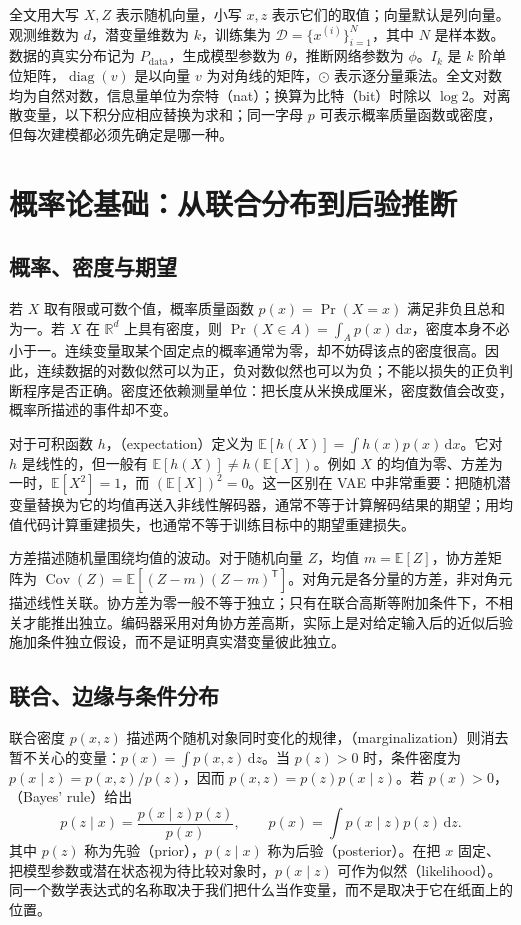 \documentclass[UTF8,12pt,a4paper,fontset=fandol]{ctexart}
\begin{document}
全文用大写 $X,Z$ 表示随机向量，小写 $x,z$ 表示它们的取值；向量默认是列向量。观测维数为 $d$，潜变量维数为 $k$，训练集为 $\mathcal D=\{x^{(i)}\}_{i=1}^{N}$，其中 $N$ 是样本数。数据的真实分布记为 $P_{\mathrm{data}}$，生成模型参数为 $\theta$，推断网络参数为 $\phi$。$I_k$ 是 $k$ 阶单位矩阵，$\operatorname{diag}(v)$ 是以向量 $v$ 为对角线的矩阵，$\odot$ 表示逐分量乘法。全文对数均为自然对数，信息量单位为奈特（nat）；换算为比特（bit）时除以 $\log 2$。对离散变量，以下积分应相应替换为求和；同一字母 $p$ 可表示概率质量函数或密度，但每次建模都必须先确定是哪一种。

\section{概率论基础：从联合分布到后验推断}
\label{sec:vae-probability}

\subsection{概率、密度与期望}
若 $X$ 取有限或可数个值，概率质量函数 $p(x)=\Pr(X=x)$ 满足非负且总和为一。若 $X$ 在 $\mathbb R^d$ 上具有密度，则 $\Pr(X\in A)=\int_A p(x)\,\mathrm dx$，密度本身不必小于一。连续变量取某个固定点的概率通常为零，却不妨碍该点的密度很高。因此，连续数据的对数似然可以为正，负对数似然也可以为负；不能以损失的正负判断程序是否正确。密度还依赖测量单位：把长度从米换成厘米，密度数值会改变，概率所描述的事件却不变。

对于可积函数 $h$，（expectation）定义为 $\mathbb E[h(X)]=\int h(x)p(x)\,\mathrm dx$。它对 $h$ 是线性的，但一般有 $\mathbb E[h(X)]\ne h(\mathbb E[X])$。例如 $X$ 的均值为零、方差为一时，$\mathbb E[X^2]=1$，而 $(\mathbb E[X])^2=0$。这一区别在 VAE 中非常重要：把随机潜变量替换为它的均值再送入非线性解码器，通常不等于计算解码结果的期望；用均值代码计算重建损失，也通常不等于训练目标中的期望重建损失。

方差描述随机量围绕均值的波动。对于随机向量 $Z$，均值 $m=\mathbb E[Z]$，协方差矩阵为 $\operatorname{Cov}(Z)=\mathbb E[(Z-m)(Z-m)^\mathsf T]$。对角元是各分量的方差，非对角元描述线性关联。协方差为零一般不等于独立；只有在联合高斯等附加条件下，不相关才能推出独立。编码器采用对角协方差高斯，实际上是对给定输入后的近似后验施加条件独立假设，而不是证明真实潜变量彼此独立。

\subsection{联合、边缘与条件分布}
联合密度 $p(x,z)$ 描述两个随机对象同时变化的规律，（marginalization）则消去暂不关心的变量：$p(x)=\int p(x,z)\,\mathrm dz$。当 $p(z)>0$ 时，条件密度为 $p(x\mid z)=p(x,z)/p(z)$，因而 $p(x,z)=p(z)p(x\mid z)$。若 $p(x)>0$，（Bayes' rule）给出
\begin{equation}
 p(z\mid x)=\frac{p(x\mid z)p(z)}{p(x)},\qquad
 p(x)=\int p(x\mid z)p(z)\,\mathrm dz.
 \label{eq:vae-bayes}
\end{equation}
其中 $p(z)$ 称为先验（prior），$p(z\mid x)$ 称为后验（posterior）。在把 $x$ 固定、把模型参数或潜在状态视为待比较对象时，$p(x\mid z)$ 可作为似然（likelihood）。同一个数学表达式的名称取决于我们把什么当作变量，而不是取决于它在纸面上的位置。
\end{document}
